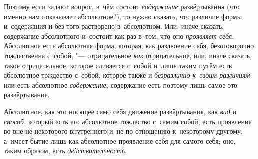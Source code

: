 Поэтому если задают вопрос, в~чём состоит
{\em содержание} развёртывания (что именно нам
показывает абсолютное?), то нужно сказать, что различие формы и~содержания
и без того растворено в~абсолютном. Или, иначе сказать, содержание
абсолютного и~состоит как раз в~том, что оно
{\em проявляет себя}. Абсолютное есть абсолютная форма,
которая, как раздвоение себя, безоговорочно тождественна с~собой, "---
отрицательное {\em как} отрицательное, или, иначе
сказать, такое отрицательное, которое сливается с~собой и~лишь таким путём
есть абсолютное тождество с~собой, которое также и
{\em безразлично к~своим различиям} или есть абсолютное
{\em содержание;} содержание есть поэтому лишь самое это развёртывание.

Абсолютное, как это носящее само себя движение развёртывания, как
{\em вид} и {\em способ,} который
есть его абсолютное тождество с~самим собой, есть проявление во вне не
некоторого внутреннего и~не по отношению к~некоторому другому, а~имеет
бытие лишь как абсолютное проявление себя для самого себя; оно, таким
образом, есть {\em действительность}.


